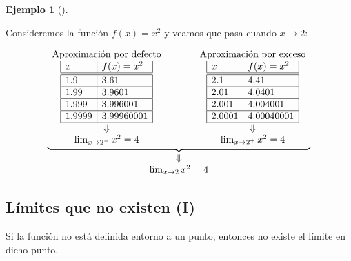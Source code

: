 \documentclass[
  a4paper,
]{scrreport}
\theoremstyle{plain}
\theoremstyle{definition}
\theoremstyle{plain}
\theoremstyle{plain}
\theoremstyle{definition}
\newtheorem{example}{Ejemplo}[chapter]
\theoremstyle{definition}
\theoremstyle{remark}
\begin{document}
\begin{example}[]\protect\hypertarget{exm-limites-aproximados}{}\label{exm-limites-aproximados}

Consideremos la función \(f(x)=x^2\) y veamos que pasa cuando
\(x\to 2\):

\[
\begin{array}{c}
\underbrace{\begin{array}{ccc}
\mbox{Aproximación por defecto} & \qquad & \mbox{Aproximación por exceso}\\
\begin{array}{|l|l|}
\hline
x       & f(x)=x^2   \\
\hline\hline
 1.9    & 3.61       \\
\hline
 1.99   & 3.9601     \\
\hline
 1.999  & 3.996001   \\
\hline
 1.9999 & 3.99960001 \\
\hline
\end{array}
& &
\begin{array}{|l|l|}
\hline
x       & f(x)=x^2   \\
\hline\hline
 2.1    & 4.41       \\
\hline
 2.01   & 4.0401    \\
\hline
 2.001  & 4.004001   \\
\hline
 2.0001 & 4.00040001 \\
\hline
\end{array}\\
\Downarrow & & \Downarrow\\
\lim_{x\to 2^-}x^2=4
& &
\lim_{x\to 2^+}x^2=4
\end{array}}\\
\Downarrow\\
\lim_{x\to 2}x^2=4
\end{array}
\]

\end{example}

\subsection{Límites que no existen
(I)}\label{luxedmites-que-no-existen-i}

Si la función no está definida entorno a un punto, entonces no existe el
límite en dicho punto.
\end{document}
